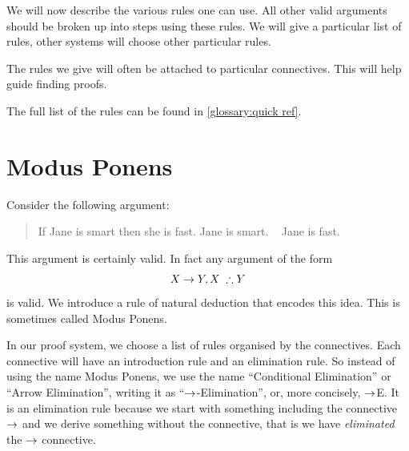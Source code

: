 %
%

We will now describe the various rules one can use. All other valid arguments should be broken up into steps using these rules. We will give a particular list of rules, other systems will choose other particular rules.

The rules we give will often be attached to particular connectives. This will help guide finding proofs.

The full list of the rules can be found in \cref{glossary:quick ref}.



\section{Modus Ponens}
Consider the following argument:
	\begin{quote}
		If Jane is smart then she is fast. Jane is smart. \therefore~ Jane is fast.
	\end{quote}
This argument is certainly valid.
In fact any argument of the form $$\metaX\eif \metaY,\metaX\;\therefore\metaY$$ is valid. We introduce a rule of natural deduction that encodes this idea. This is sometimes
called {Modus Ponens}.

In our proof system, we choose a list of rules organised by the connectives. Each connective will have an introduction rule and an elimination rule. So instead of using the name Modus Ponens, we use the name ``Conditional Elimination'' or ``Arrow Elimination'', writing it as ``$\rightarrow$-Elimination'', or, more concisely, $\rightarrow$E. 
It is an elimination rule because we {start} with something including the connective $\rightarrow$ and we derive something without the connective, that is we have \emph{eliminated} the $\rightarrow$ connective. 

